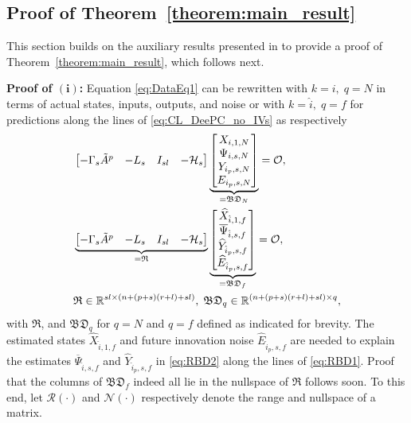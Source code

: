 \subsection{Proof of Theorem~\ref{theorem:main_result}}%
This section builds on the auxiliary results presented in  to provide a proof of Theorem~\ref{theorem:main_result}, which follows next.

\noindent\textbf{Proof of $\mathrm{\mathbf{(i)}}$:} 
Equation \eqref{eq:DataEq1} can be rewritten with $k=i,\;q=N$ in terms of actual states, inputs, outputs, and noise or with $k=\hat{i},\;q=f$ for predictions along the lines of \eqref{eq:CL_DeePC_no_IVs} as respectively
\begin{align}
    &\begin{bmatrix}-\Gamma_s \tilde{A}^p & -L_s & I_{sl}&-\mathcal{H}_s\end{bmatrix}
    \underbrace{\begin{bmatrix}
        X_{i,1,N}\\
        \Psi_{i,s,N}\\
        Y_{i_p,s,N}\\
        E_{i_p,s,N}
    \end{bmatrix}}_{=\mathfrak{BD}_N}=\mathcal{O},\label{eq:RBD1}\\
    &\underbrace{\begin{bmatrix}-\Gamma_s \tilde{A}^p & -L_s & I_{sl}&-\mathcal{H}_s\end{bmatrix}}_{= \mathfrak{R}}
    \underbrace{\begin{bmatrix}
        \widehat{X}_{\hat{i},1,f}\\
        \overline{\Psi}_{\hat{i},s,f}\\
        \widehat{Y}_{\hat{i}_p,s,f}\\
        \widehat{E}_{\hat{i}_p,s,f}
    \end{bmatrix}}_{=\mathfrak{BD}_f}=\mathcal{O},\label{eq:RBD2}\\
    &\mathfrak{R}\in\mathbb{R}^{sl\times (n+(p+s)(r+l)+sl)},\;\mathfrak{BD}_q\in\mathbb{R}^{(n+(p+s)(r+l)+sl) \times q},\notag
\end{align}
with $\mathfrak{R}$, and $\mathfrak{BD}_q$ for $q=N$ and $q=f$ defined as indicated for brevity. The estimated states $\widehat{X}_{\hat{i},1,f}$ and future innovation noise $\widehat{E}_{\hat{i}_p,s,f}$ are needed to explain the estimates $\overline{\Psi}_{\hat{i},s,f}$ and $\widehat{Y}_{\hat{i}_p,s,f}$ in \eqref{eq:RBD2} along the lines of \eqref{eq:RBD1}. Proof that the columns of $\mathfrak{BD}_f$ indeed all lie in the nullspace of $\mathfrak{R}$ follows soon. To this end, let $\mathcal{R}(\cdot)$ and $\mathcal{N}(\cdot)$ respectively denote the range and nullspace of a matrix.


